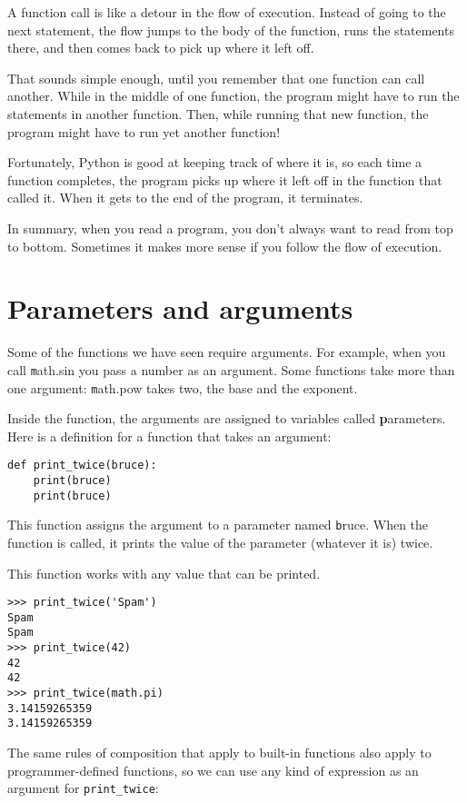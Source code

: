 \documentclass[
DIV=11,
fontsize=13,
twoside,
headinclude=false,
titlepage=firstiscover,
abstract=true,
headsepline=true,
footsepline=true,
chapterprefix=true, %
headings=big,
bibliography=totoc,%
captions=tableheading
]{scrbook}
\theoremstyle{definition}
\begin{document}
A function call is like a detour in the flow of execution. Instead of
going to the next statement, the flow jumps to the body of
the function, runs the statements there, and then comes back
to pick up where it left off.

That sounds simple enough, until you remember that one function can
call another.  While in the middle of one function, the program might
have to run the statements in another function.  Then, while
running that new function, the program might have to run yet
another function!

Fortunately, Python is good at keeping track of where it is, so each
time a function completes, the program picks up where it left off in
the function that called it.  When it gets to the end of the program,
it terminates.

In summary, when you read a program, you
don't always want to read from top to bottom.  Sometimes it makes
more sense if you follow the flow of execution.


\section{Parameters and arguments}
\label{parameters}

Some of the functions we have seen require arguments.  For
example, when you call {\texttt math.sin} you pass a number
as an argument.  Some functions take more than one argument:
{\texttt math.pow} takes two, the base and the exponent.

Inside the function, the arguments are assigned to
variables called {\textbf parameters}.  Here is a definition for
a function that takes an argument:

\begin{lstlisting}
def print_twice(bruce):
    print(bruce)
    print(bruce)
\end{lstlisting}
%
This function assigns the argument to a parameter
named {\texttt bruce}.  When the function is called, it prints the value of
the parameter (whatever it is) twice.

This function works with any value that can be printed.

\begin{lstlisting}
>>> print_twice('Spam')
Spam
Spam
>>> print_twice(42)
42
42
>>> print_twice(math.pi)
3.14159265359
3.14159265359
\end{lstlisting}
%
The same rules of composition that apply to built-in functions also
apply to programmer-defined functions, so we can use any kind of expression
as an argument for \verb"print_twice":
\end{document}
